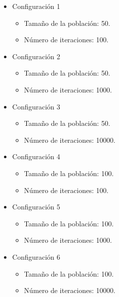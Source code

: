 \documentclass[letter, 10pt]{article}
\begin{document}
\begin{itemize}
    \item Configuración 1
    
    \begin{itemize}
        \item Tamaño de la población: 50.
        \item Número de iteraciones: 100.
    \end{itemize}
    
    \item Configuración 2
    
    \begin{itemize}
        \item Tamaño de la población: 50.
        \item Número de iteraciones: 1000.
    \end{itemize}
    
    \item Configuración 3
    
    \begin{itemize}
        \item Tamaño de la población: 50.
        \item Número de iteraciones: 10000.
    \end{itemize}
    
    \item Configuración 4
    
    \begin{itemize}
        \item Tamaño de la población: 100.
        \item Número de iteraciones: 100.
    \end{itemize}
    
    \item Configuración 5
    
    \begin{itemize}
        \item Tamaño de la población: 100.
        \item Número de iteraciones: 1000.
    \end{itemize}
    
    \item Configuración 6
    
    \begin{itemize}
        \item Tamaño de la población: 100.
        \item Número de iteraciones: 10000.
    \end{itemize}
\end{itemize}
\end{document}
